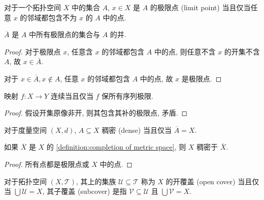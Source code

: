 \begin{definition}[极限点]
    对于一个拓扑空间 \(X\) 中的集合 \(A\), \(x \in X\) 是 \(A\) 的极限点 (limit point) 当且仅当任意 \(x\) 的邻域都包含不为 \(x\) 的 \(A\) 中的点.
\end{definition}

\begin{lemma}
    \(\overline{A}\) 是 \(A\) 中所有极限点的集合与 \(A\) 的并.

    \begin{proof}
        对于极限点 \(x\), 任意含 \(x\) 的邻域都包含 \(A\) 中的点, 则任意不含 \(x\) 的开集不含 \(A\), 故 \(x \in \overline{A}\).

        对于 \(x \in \overline{A}, x \notin A\), 任意 \(x\) 的邻域都包含 \(A\) 中的点, 故 \(x\) 是极限点.
    \end{proof}
\end{lemma}

\begin{corollary}
    映射 \(f : X \to Y\) 连续当且仅当 \(f\) 保所有序列极限.

    \begin{proof}
        假设开集原像非开, 则其包含其补的极限点, 矛盾.
    \end{proof}
\end{corollary}

\begin{definition}[稠密]
    \label {definition:dense in topological space}
    对于度量空间 \((X,d)\), \(A \subseteq X\) 稠密 (dense) 当且仅当 \(\overline{A} = X\).
\end{definition}

\begin{example}
    如果 \(\overline{X}\) 是 \(X\) 的 \ref{definition:completion of metric space}, 则 \(X\) 稠密于 \(\overline{X}\).

    \begin{proof}
        所有点都是极限点或 \(X\) 中的点.
    \end{proof}
\end{example}

\begin{definition}[开覆盖]
    对于拓扑空间 \((X,\mathcal{T})\), 其上的集族 \(\mathcal{U} \subseteq \mathcal{T}\) 称为 \(X\) 的开覆盖 (open cover) 当且仅当 \(\bigcup \mathcal{U} = X\),
    其子覆盖 (subcover) 是指 \(\mathcal{V} \subseteq \mathcal{U}\) 且 \(\bigcup \mathcal{V} = X\).
\end{definition}

